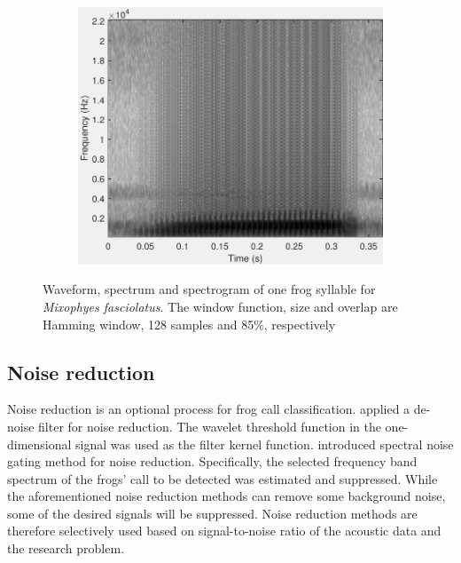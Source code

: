 \begin{figure}[htb!]
\begin{subfigure}[b]{0.32\textwidth}
           \includegraphics[width=1\textwidth,height=0.75\textwidth]{image/LR/spectrogram.pdf}
    \end{subfigure}%
\caption[Waveform, spectrum and spectrogram of one frog syllable]{Waveform, spectrum and spectrogram of one frog syllable for \textit{Mixophyes fasciolatus}. The window function, size and overlap are Hamming window, 128 samples and 85\%, respectively}
\label{fig:spectrogram}       %
\end{figure}





\subsection{Noise reduction}
Noise reduction is an optional process for frog call classification. 
\cite{Huang20141} applied a de-noise filter for noise reduction. The wavelet threshold function in the one-dimensional signal was used as the filter kernel function.
\cite{bedoya2014automatic} introduced spectral noise gating method for noise reduction. Specifically, the selected frequency band spectrum of the frogs' call to be detected was estimated and suppressed. While the aforementioned noise reduction methods can remove some background noise, some of the desired signals will be suppressed. Noise reduction methods are therefore selectively used based on signal-to-noise ratio of the acoustic data and the research problem.




